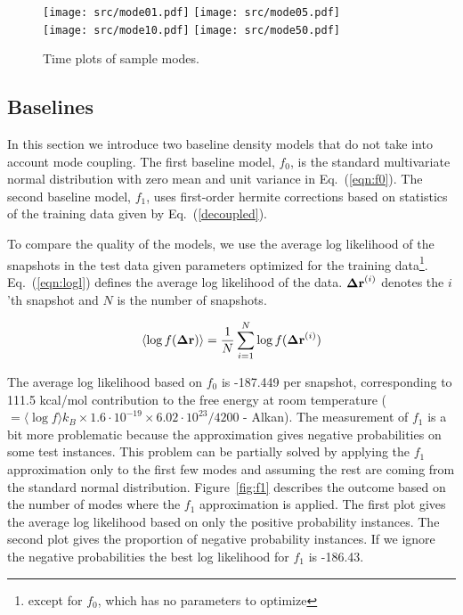 \documentclass{article}
\begin{document}

\begin{figure}[h]
  \texttt{[image: src/mode01.pdf]}
  \texttt{[image: src/mode05.pdf]} \\
  \texttt{[image: src/mode10.pdf]}
  \texttt{[image: src/mode50.pdf]}
\caption{Time plots of sample modes.}
\label{fig:timeplots}
\end{figure}

\subsection{Baselines}		%

In this section we introduce two baseline density models that do not
take into account mode coupling.  The first baseline model, $f_0$, is
the standard multivariate normal distribution with zero mean and unit
variance in Eq.~(\ref{eqn:f0}).  The second baseline model, $f_1$, uses
first-order hermite corrections based on statistics of the training
data given by Eq.~(\ref{decoupled}).

To compare the quality of the models, we use the average log
likelihood of the snapshots in the test data given parameters
optimized for the training data\footnote{except for $f_0$, which has
no parameters to optimize}.  Eq.~(\ref{eqn:logl}) defines the
average log likelihood of the data.  ${\bf\Delta r}^{(i)}$ denotes the
$i$'th snapshot and $N$ is the number of snapshots.

\begin{equation}
\label{eqn:logl}
\left< \log f({\bf\Delta r}) \right> = \frac{1}{N} \sum_{i=1}^N \log f({\bf\Delta r}^{(i)})
\end{equation}

The average log likelihood based on $f_0$ is -187.449 per snapshot,
corresponding to 111.5 kcal/mol contribution to the free energy at
room temperature ( $= \langle\log f\rangle k_B\times 1.6\cdot
10^{-19}\times 6.02\cdot 10^{23} / 4200$ - Alkan). The measurement of $f_1$ is a
bit more problematic because the approximation gives negative
probabilities on some test instances.  This problem can be partially
solved by applying the $f_1$ approximation only to the first few modes
and assuming the rest are coming from the standard normal
distribution.  Figure~\ref{fig:f1} describes the outcome based on the
number of modes where the $f_1$ approximation is applied.  The first
plot gives the average log likelihood based on only the positive
probability instances.  The second plot gives the proportion of
negative probability instances.  If we ignore the negative
probabilities the best log likelihood for $f_1$ is -186.43.
\end{document}
